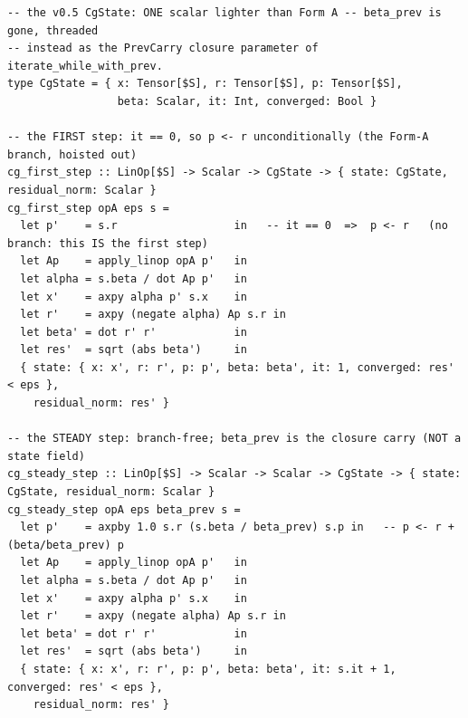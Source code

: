 \begin{lstlisting}[style=l4style]
-- the v0.5 CgState: ONE scalar lighter than Form A -- beta_prev is gone, threaded
-- instead as the PrevCarry closure parameter of iterate_while_with_prev.
type CgState = { x: Tensor[$S], r: Tensor[$S], p: Tensor[$S],
                 beta: Scalar, it: Int, converged: Bool }

-- the FIRST step: it == 0, so p <- r unconditionally (the Form-A branch, hoisted out)
cg_first_step :: LinOp[$S] -> Scalar -> CgState -> { state: CgState, residual_norm: Scalar }
cg_first_step opA eps s =
  let p'    = s.r                  in   -- it == 0  =>  p <- r   (no branch: this IS the first step)
  let Ap    = apply_linop opA p'   in
  let alpha = s.beta / dot Ap p'   in
  let x'    = axpy alpha p' s.x    in
  let r'    = axpy (negate alpha) Ap s.r in
  let beta' = dot r' r'            in
  let res'  = sqrt (abs beta')     in
  { state: { x: x', r: r', p: p', beta: beta', it: 1, converged: res' < eps },
    residual_norm: res' }

-- the STEADY step: branch-free; beta_prev is the closure carry (NOT a state field)
cg_steady_step :: LinOp[$S] -> Scalar -> Scalar -> CgState -> { state: CgState, residual_norm: Scalar }
cg_steady_step opA eps beta_prev s =
  let p'    = axpby 1.0 s.r (s.beta / beta_prev) s.p in   -- p <- r + (beta/beta_prev) p
  let Ap    = apply_linop opA p'   in
  let alpha = s.beta / dot Ap p'   in
  let x'    = axpy alpha p' s.x    in
  let r'    = axpy (negate alpha) Ap s.r in
  let beta' = dot r' r'            in
  let res'  = sqrt (abs beta')     in
  { state: { x: x', r: r', p: p', beta: beta', it: s.it + 1, converged: res' < eps },
    residual_norm: res' }


\end{lstlisting}
